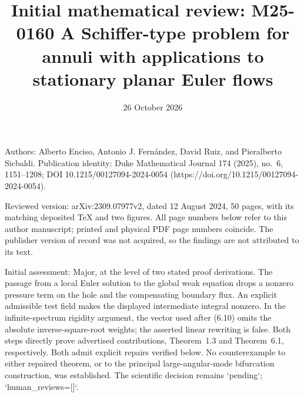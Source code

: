 \documentclass[10pt]{article}
\title{Initial mathematical review: M25-0160
A Schiffer-type problem for annuli with applications to stationary planar Euler flows}
\author{}
\date{26 October 2026}
\begin{document}
\maketitle
Authors: Alberto Enciso, Antonio J. Fernández, David Ruiz, and Pieralberto Sicbaldi. Publication identity: Duke Mathematical Journal 174 (2025), no. 6, 1151–1208; DOI 10.1215/00127094-2024-0054 (https://doi.org/10.1215/00127094-2024-0054).\par
Reviewed version: arXiv:2309.07977v2, dated 12 August 2024, 50 pages, with its matching deposited TeX and two figures. All page numbers below refer to this author manuscript; printed and physical PDF page numbers coincide. The publisher version of record was not acquired, so the findings are not attributed to its text.\par
Initial assessment: Major, at the level of two stated proof derivations. The passage from a local Euler solution to the global weak equation drops a nonzero pressure term on the hole and the compensating boundary flux. An explicit admissible test field makes the displayed intermediate integral nonzero. In the infinite-spectrum rigidity argument, the vector used after (6.10) omits the absolute inverse-square-root weights; the asserted linear rewriting is false. Both steps directly prove advertised contributions, Theorem 1.3 and Theorem 6.1, respectively. Both admit explicit repairs verified below. No counterexample to either repaired theorem, or to the principal large-angular-mode bifurcation construction, was established. The scientific decision remains `pending`; `human\_reviews=[]`.\par
\end{document}

